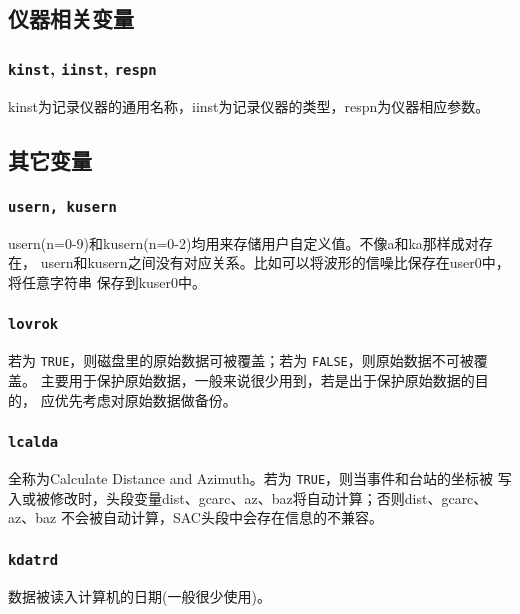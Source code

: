 \subsection{仪器相关变量}
\subsubsection{\texttt{kinst}, \texttt{iinst}\dag, \texttt{respn}\dag}
kinst为记录仪器的通用名称，iinst为记录仪器的类型，respn为仪器相应参数。

\subsection{其它变量}
\subsubsection{\texttt{usern, kusern}}
usern(n=0-9)和kusern(n=0-2)均用来存储用户自定义值。不像a和ka那样成对存在，
usern和kusern之间没有对应关系。比如可以将波形的信噪比保存在user0中，将任意字符串
保存到kuser0中。

\subsubsection{\texttt{lovrok}}
若为 \texttt{TRUE}，则磁盘里的原始数据可被覆盖；若为 \texttt{FALSE}，则原始数据不可被覆盖。
主要用于保护原始数据，一般来说很少用到，若是出于保护原始数据的目的，
应优先考虑对原始数据做备份。

\subsubsection{\texttt{lcalda}}
全称为Calculate Distance and Azimuth。若为 \texttt{TRUE}，则当事件和台站的坐标被
写入或被修改时，头段变量dist、gcarc、az、baz将自动计算；否则dist、gcarc、az、baz
不会被自动计算，SAC头段中会存在信息的不兼容。

\subsubsection{\texttt{kdatrd}}
数据被读入计算机的日期(一般很少使用)。
